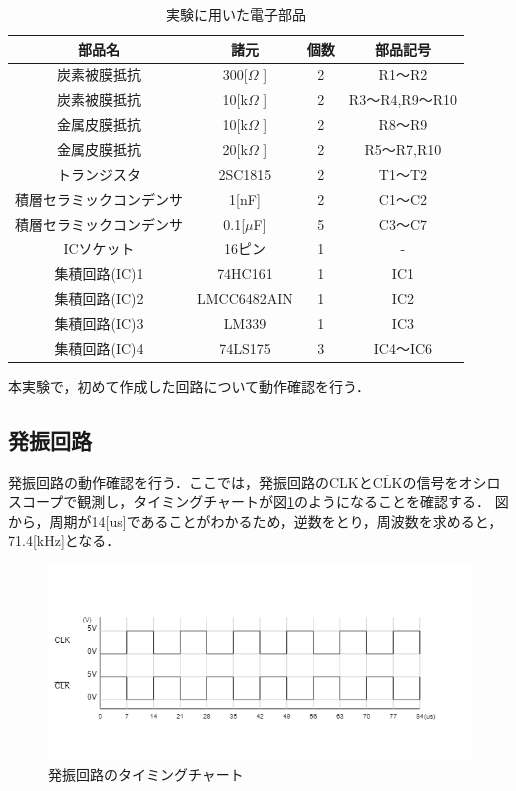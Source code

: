 \documentclass[a4paper,11pt,dvipdfmx]{jsarticle}
\begin{document}
\begin{table}[H]
  \caption{実験に用いた電子部品}
  \centering
  \begin{tabular}{|c|c|c|c|}
    \hline
    部品名                   & 諸元         & 個数 & 部品記号       \\
    \hline
    炭素被膜抵抗             & 300[$\Omega$ ] & 2    & R1～R2         \\
    \hline
    炭素被膜抵抗             & 10[k$\Omega$ ] & 2    & R3～R4,R9～R10 \\
    \hline
    金属皮膜抵抗             & 10[k$\Omega$ ] & 2    & R8～R9         \\
    \hline
    金属皮膜抵抗             & 20[k$\Omega$ ] & 2    & R5～R7,R10     \\
    \hline
    トランジスタ             & 2SC1815      & 2    & T1～T2         \\
    \hline
    積層セラミックコンデンサ & 1[nF]        & 2    & C1～C2         \\
    \hline
    積層セラミックコンデンサ & 0.1[$\mu$F]   & 5    & C3～C7         \\
    \hline
    ICソケット               & 16ピン       & 1    & -              \\
    \hline
    集積回路(IC)1            & 74HC161      & 1    & IC1            \\
    \hline
    集積回路(IC)2            & LMCC6482AIN  & 1    & IC2            \\
    \hline
    集積回路(IC)3            & LM339        & 1    & IC3            \\
    \hline
    集積回路(IC)4            & 74LS175      & 3    & IC4～IC6       \\
    \hline
  \end{tabular}
  \label{tab:electronicParts}
\end{table}

本実験で，初めて作成した回路について動作確認を行う．

\subsection{発振回路}
発振回路の動作確認を行う．ここでは，発振回路のCLKと$\overline{\text{CLK}}$の信号をオシロスコープで観測し，タイミングチャートが図\ref{fig:clock}のようになることを確認する．
図から，周期が14[us]であることがわかるため，逆数をとり，周波数を求めると，71.4[kHz]となる．

\begin{figure}[H]
  \centering
  \includegraphics[width=0.8\linewidth]{./images/clock.png}
  \caption{発振回路のタイミングチャート}
  \label{fig:clock}
\end{figure}
\end{document}
